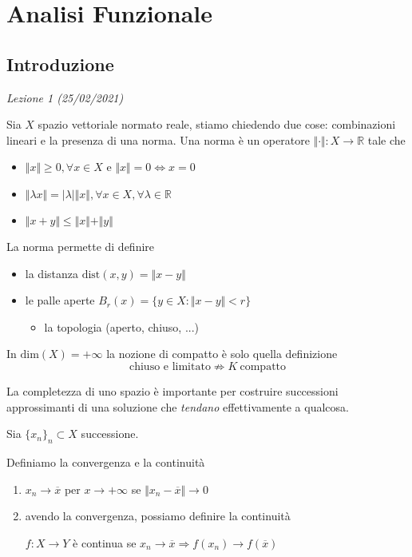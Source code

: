 \documentclass[10pt,a4paper,twoside,openright]{book}
\begin{document}
\part{Analisi Funzionale}

\chapter{Introduzione}
\textit{Lezione 1 (25/02/2021)}

Sia $X$ spazio vettoriale normato reale, stiamo chiedendo due cose: combinazioni lineari e la presenza di una norma. Una norma è un operatore $\Vert \cdotp \Vert :X\rightarrow \mathbb{R}$ tale che
\begin{itemize}
\item $\Vert x\Vert \geqslant 0,\forall x\in X$ e $\Vert x\Vert =0\Leftrightarrow x=0$
\item $\Vert \lambda x\Vert =| \lambda | \Vert x\Vert,\forall x\in X,\forall \lambda \in \mathbb{R}$
\item $\Vert x+y\Vert \leqslant \Vert x\Vert +\Vert y\Vert $
\end{itemize}

La norma permette di definire
\begin{itemize}
\item la distanza $\text{dist}(x,y) =\Vert x-y\Vert $
\item le palle aperte $B_{r}(x) =\{y\in X:\Vert x-y\Vert < r\}$
\begin{itemize}
\item la topologia (aperto, chiuso, ...)
\end{itemize}
\end{itemize}
\begin{nb}
In $\mathrm{dim}(X) =+\infty $ la nozione di compatto è solo quella definizione
\begin{equation*}
\text{chiuso e limitato} \nRightarrow K\ \text{compatto}
\end{equation*}
\end{nb}
La completezza di uno spazio è importante per costruire successioni approssimanti di una soluzione che \textit{tendano} effettivamente a qualcosa.



Sia $\{x_{n}\}_{n} \subset X$ successione.
\begin{definition}
Definiamo la convergenza e la continuità
\begin{enumerate}
\item $x_{n}\rightarrow \overline{x}$ per $x\rightarrow +\infty $ se $\Vert x_{n} -\overline{x}\Vert \rightarrow 0$
\item avendo la convergenza, possiamo definire la continuità

$f:X\rightarrow Y$ è continua se $x_{n}\rightarrow \overline{x} \Rightarrow f(x_{n})\rightarrow f(\overline{x})$
\end{enumerate}
\end{definition}
\end{document}
